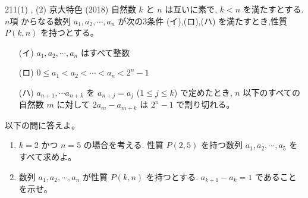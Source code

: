 \begin{thm}{211}{(1) , (2) }{京大特色 (2018)}
 自然数 $k$ と $n$ は互いに素で, $k<n$ を満たすとする. $n$項 からなる数列 $a_1,a_2,\cdots,a_n$ が次の3条件 (イ),(ロ),(ハ) を満たすとき,性質 $P(k,n)$ を持つとする。
 \begin{itemize}
  \item[(イ)] $a_1,a_2,\cdots,a_n$ はすべて整数
  \item[(ロ)] $0\le a_1<a_2<\cdots<a_n<2^n-1$
  \item[(ハ)] $a_{n+1},\cdots a_{n+k}$ を $a_{n+j}=a_j$ ($1\le j\le k$) で定めたとき, $n$ 以下のすべての自然数 $m$ に対して $2a_m-a_{m+k}$ は $2^n-1$ で割り切れる。
 \end{itemize}
 以下の問に答えよ。
 \begin{enumerate}
  \item $k=2$ かつ $n=5$ の場合を考える. 性質 $P(2,5)$ を持つ数列 $a_1,a_2,\cdots,a_5$ をすべて求めよ。
  \item 数列 $a_1,a_2,\cdots,a_n$ が性質 $P(k,n)$ を持つとする. $a_{k+1}-a_k=1$ であることを示せ。
 \end{enumerate}
\end{thm}

